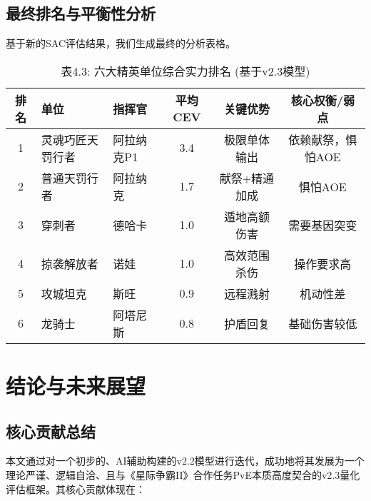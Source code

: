 \documentclass[a4paper,12pt]{article}
\begin{document}
\subsection{最终排名与平衡性分析}
基于新的SAC评估结果，我们生成最终的分析表格。

\begin{table}[h!]
\centering
\caption{表4.3: 六大精英单位综合实力排名 (基于v2.3模型)}
\begin{tabular}{cllccc}
\toprule
\textbf{排名} & \textbf{单位} & \textbf{指挥官} & \textbf{平均CEV} & \textbf{关键优势} & \textbf{核心权衡/弱点} \\
\midrule
1 & 灵魂巧匠天罚行者 & 阿拉纳克P1 & 3.4 & 极限单体输出 & 依赖献祭，惧怕AOE \\
2 & 普通天罚行者 & 阿拉纳克 & 1.7 & 献祭+精通加成 & 惧怕AOE \\
3 & 穿刺者 & 德哈卡 & 1.0 & 遁地高额伤害 & 需要基因突变 \\
4 & 掠袭解放者 & 诺娃 & 1.0 & 高效范围杀伤 & 操作要求高 \\
5 & 攻城坦克 & 斯旺 & 0.9 & 远程溅射 & 机动性差 \\
6 & 龙骑士 & 阿塔尼斯 & 0.8 & 护盾回复 & 基础伤害较低 \\
\bottomrule
\end{tabular}
\end{table}

\section{结论与未来展望}

\subsection{核心贡献总结}
本文通过对一个初步的、AI辅助构建的v2.2模型进行迭代，成功地将其发展为一个理论严谨、逻辑自洽、且与《星际争霸II》合作任务PvE本质高度契合的v2.3量化评估框架。其核心贡献体现在：
\end{document}
